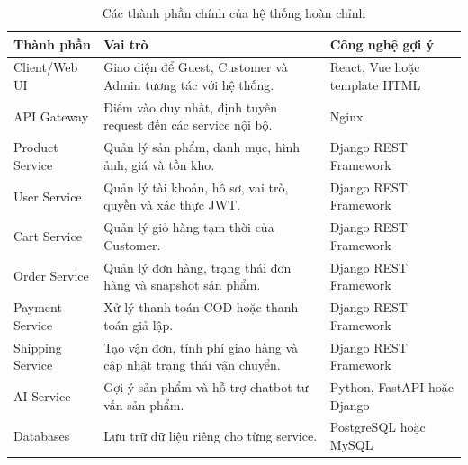 \documentclass[../main.tex]{subfiles}
\begin{document}
\begin{table}[H]
    \centering
    \caption{Các thành phần chính của hệ thống hoàn chỉnh}
    \label{tab:chapter4-system-components}
    \begin{tabular}{|p{}|p{}|p{}|}
        \hline
        \rowcolor{primary!35}
        \textbf{Thành phần} & \textbf{Vai trò} & \textbf{Công nghệ gợi ý} \\
        \hline
        Client/Web UI & Giao diện để Guest, Customer và Admin tương tác với hệ thống. & React, Vue hoặc template HTML \\
        \hline
        API Gateway & Điểm vào duy nhất, định tuyến request đến các service nội bộ. & Nginx \\
        \hline
        Product Service & Quản lý sản phẩm, danh mục, hình ảnh, giá và tồn kho. & Django REST Framework \\
        \hline
        User Service & Quản lý tài khoản, hồ sơ, vai trò, quyền và xác thực JWT. & Django REST Framework \\
        \hline
        Cart Service & Quản lý giỏ hàng tạm thời của Customer. & Django REST Framework \\
        \hline
        Order Service & Quản lý đơn hàng, trạng thái đơn hàng và snapshot sản phẩm. & Django REST Framework \\
        \hline
        Payment Service & Xử lý thanh toán COD hoặc thanh toán giả lập. & Django REST Framework \\
        \hline
        Shipping Service & Tạo vận đơn, tính phí giao hàng và cập nhật trạng thái vận chuyển. & Django REST Framework \\
        \hline
        AI Service & Gợi ý sản phẩm và hỗ trợ chatbot tư vấn sản phẩm. & Python, FastAPI hoặc Django \\
        \hline
        Databases & Lưu trữ dữ liệu riêng cho từng service. & PostgreSQL hoặc MySQL \\
        \hline
    \end{tabular}
\end{table}
\end{document}
